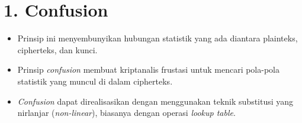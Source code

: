 \documentclass{article}
\begin{document}

\section*{1. Confusion}

\begin{itemize}
    \item Prinsip ini menyembunyikan hubungan statistik yang ada diantara plainteks, cipherteks, dan kunci.
    \item Prinsip \textit{confusion} membuat kriptanalis frustasi untuk mencari pola-pola statistik yang muncul di dalam cipherteks.
    \item \textit{Confusion} dapat direalisasikan dengan menggunakan teknik substitusi yang nirlanjar (\textit{non-linear}), biasanya dengan operasi \textit{lookup table}.
\end{itemize}
\end{document}

